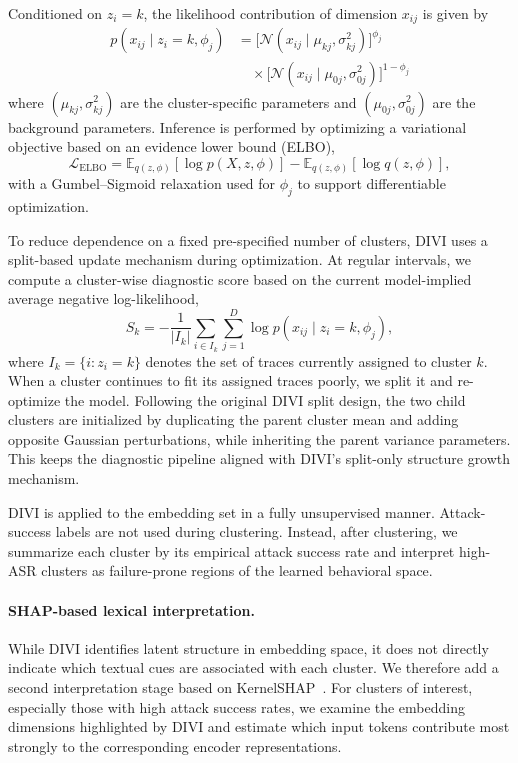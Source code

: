 ﻿\documentclass[conference]{IEEEtran}
\begin{document}
Conditioned on \(z_i = k\), the likelihood contribution of dimension \(x_{ij}\) is given by
{\small
\begin{equation}
\begin{aligned}
p(x_{ij}\mid z_i=k,\phi_j)
&=
\Big[\mathcal{N}(x_{ij}\mid \mu_{kj},\sigma_{kj}^2)\Big]^{\phi_j}
\\[-0.2em]
&\quad \times
\Big[\mathcal{N}(x_{ij}\mid \mu_{0j},\sigma_{0j}^2)\Big]^{1-\phi_j}
\end{aligned}
\end{equation}
}
where \((\mu_{kj},\sigma_{kj}^2)\) are the cluster-specific parameters and \((\mu_{0j},\sigma_{0j}^2)\) are the background parameters. Inference is performed by optimizing a variational objective based on an evidence lower bound (ELBO),
\[
\mathcal{L}_{\mathrm{ELBO}}
=
\mathbb{E}_{q(z,\phi)}[\log p(X,z,\phi)]
-
\mathbb{E}_{q(z,\phi)}[\log q(z,\phi)],
\]
with a Gumbel--Sigmoid relaxation used for \(\phi_j\) to support differentiable optimization.

To reduce dependence on a fixed pre-specified number of clusters, DIVI uses a split-based update mechanism during optimization. At regular intervals, we compute a cluster-wise diagnostic score based on the current model-implied average negative log-likelihood,
\[
S_k
=
-\frac{1}{|I_k|}
\sum_{i\in I_k}
\sum_{j=1}^{D}
\log p(x_{ij}\mid z_i=k,\phi_j),
\]
where \(I_k = \{i : z_i = k\}\) denotes the set of traces currently assigned to cluster \(k\). When a cluster continues to fit its assigned traces poorly, we split it and re-optimize the model. Following the original DIVI split design, the two child clusters are initialized by duplicating the parent cluster mean and adding opposite Gaussian perturbations, while inheriting the parent variance parameters. This keeps the diagnostic pipeline aligned with DIVI's split-only structure growth mechanism.

DIVI is applied to the embedding set in a fully unsupervised manner. Attack-success labels are not used during clustering. Instead, after clustering, we summarize each cluster by its empirical attack success rate and interpret high-ASR clusters as failure-prone regions of the learned behavioral space.

\paragraph{SHAP-based lexical interpretation.}
While DIVI identifies latent structure in embedding space, it does not directly indicate which textual cues are associated with each cluster. We therefore add a second interpretation stage based on KernelSHAP~\cite{lundberg2017unified,lundberg2020local}. For clusters of interest, especially those with high attack success rates, we examine the embedding dimensions highlighted by DIVI and estimate which input tokens contribute most strongly to the corresponding encoder representations.
\end{document}
